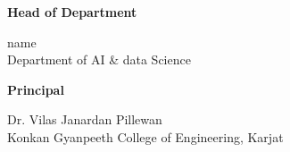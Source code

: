 \documentclass[12pt, a4paper, oneside]{Thesis} %
\begin{document}
{\begin{minipage}{0.5\textwidth}
	\begin{flushleft} 
		{\begin{center} \large
		\textbf{Head of Department}
		\begin{center}
			{\textlangle name\textrangle \\ 
			\normalsize{Department of AI \& data Science}}
		\end{center}
	\end{center}}
	\end{flushleft}
\end{minipage}
\begin{minipage}{0.5\textwidth}
	{\begin{center} \large
		\textbf{Principal}
		\begin{center}
			{Dr. Vilas Janardan Pillewan\\ 
			\normalsize{Konkan Gyanpeeth College of Engineering, Karjat}}
		\end{center}
	\end{center}}
\end{minipage}
}

\clearpage %
\end{document}

